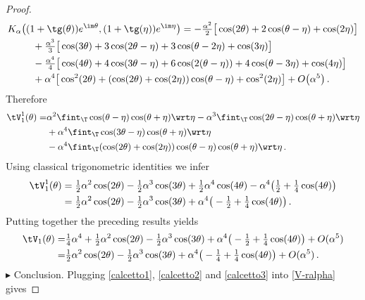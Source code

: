 \documentclass[a4paper,reqno,10pt]{article}
\begin{document}
\begin{proof}
    \begin{equation*}
			\begin{aligned}
			K_\alpha\big( & (1+\tg(\theta))e^{\im\theta} ,  (1+\tg(\eta))e^{\im\eta} \big)  = - \tfrac{\alpha^2}{2}\big[  \cos(2\theta) +2 \cos(\theta-\eta) + \cos(2\eta) \big] \\
			& \ \ +\tfrac{\alpha^3}{3} \big[ \cos(3\theta) + 3\cos(2\theta-\eta) + 3 \cos(\theta-2\eta) + \cos(3\eta) \big] \\
			& \ \ - \tfrac{\alpha^4}{4} \big[ \cos(4\theta) + 4 \cos(3\theta-\eta) + 6\cos(2(\theta-\eta))  + 4\cos(\theta-3\eta) + \cos(4\eta)\big] \\
			& \ \ +\alpha^4\big[ \cos^2(2\theta)  + (\cos(2\theta)+\cos(2\eta)) \cos(\theta-\eta) + \cos^2(2\eta) \big] +O\big(\alpha^5 \big) \,.
		\end{aligned}
	\end{equation*}
    Therefore
    \begin{align*}
		\tV_{1}^1(\theta) =&	\alpha^2 \fint_{\T} \cos(\theta-\eta) \cos(\theta+\eta)  \wrt \eta-\alpha^3  \fint_{\T} \cos(2\theta-\eta) \cos(\theta+\eta)  \wrt \eta \\
       &+\alpha^4  \fint_{\T} \cos(3\theta-\eta) \cos(\theta+\eta)  \wrt \eta\\
       &-\alpha^4\fint_{\T} (\cos(2\theta)+\cos(2\eta)) \cos(\theta-\eta) \cos(\theta+\eta)  \wrt \eta\,.
	\end{align*}
   Using classical  trigonometric identities we infer
      \begin{align*} \tV_{1}^1(\theta) &=	\tfrac12\alpha^2 \cos(2\theta)-\tfrac12\alpha^3  \cos(3\theta) +\tfrac12\alpha^4  \cos(4\theta)-\alpha^4\big(\tfrac12+\tfrac14\cos(4\theta)\big)\\
        &=\tfrac12\alpha^2 \cos(2\theta)-\tfrac12\alpha^3  \cos(3\theta) +\alpha^4\big(-\tfrac12+\tfrac14\cos(4\theta)\big)\,.
	\end{align*}
    Putting together the preceding results yields
   \begin{align}\label{calcetto3}
		\nonumber \tV_{1}(\theta) =&	\tfrac14\alpha^4+\tfrac12\alpha^2 \cos(2\theta)-\tfrac12\alpha^3  \cos(3\theta) +\alpha^4\big(-\tfrac12+\tfrac14\cos(4\theta)\big)+O(\alpha^5)\\
       =&	\tfrac12\alpha^2 \cos(2\theta)-\tfrac12\alpha^3  \cos(3\theta) +\alpha^4\big(-\tfrac14+\tfrac14\cos(4\theta)\big)+O(\alpha^5) \,.
	\end{align} 
\noindent $\blacktriangleright$ {\sc Conclusion.}
Plugging \eqref{calcetto1}, \eqref{calcetto2} and \eqref{calcetto3} into \eqref{V-ralpha} gives

\end{proof}
\end{document}
